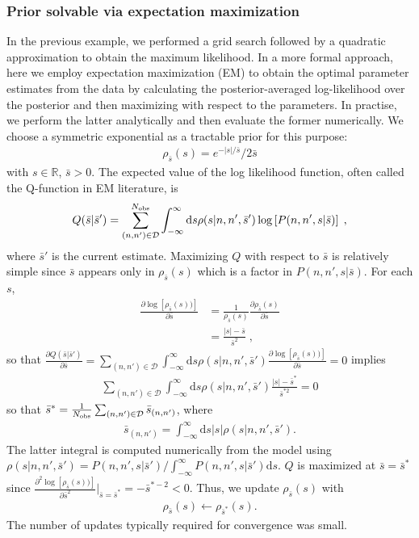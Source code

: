 \documentclass[letterpaper,english,prl,reprint,longbibliography]{revtex4-1} %
\begin{document}
\subsubsection*{Prior solvable via expectation maximization}
In the previous example, we performed a grid search followed by a quadratic approximation to obtain the maximum likelihood. In a more formal approach, here we employ expectation maximization (EM) to obtain the optimal parameter estimates from the data by calculating the posterior-averaged log-likelihood over the posterior and then maximizing with respect to the parameters. In practise, we perform the latter analytically and then evaluate the former numerically. We choose a symmetric exponential as a tractable prior for this purpose:
\begin{align}
	\rho_{\bar{s}}(s)=e^{-|s|/\bar{s}}/2\bar{s}
\end{align}
with $s\in\mathbb{R}$, $\bar{s}>0$. The expected value of the log likelihood function, often called the Q-function in EM literature, is 
 \begin{align}
 Q(\bar{s}|\bar{s}')=\sum_{(n,n')\in\mathcal{D}}^{N_\textrm{\textrm{obs}}}\int_{-\infty}^{\infty}\mathrm{d}s\rho(s|n,n',\bar{s}')\log \left[P(n,n',s|\bar{s})\right]\;,
 \end{align}
 where $\bar{s}'$ is the current estimate.
 Maximizing $Q$  with respect to $\bar{s}$ is relatively simple since $\bar{s}$ appears only in $\rho_{\bar{s}}(s)$  which is a factor in $P(n,n',s|\bar{s})$. For each $s$,
 \begin{align}
 \frac{\partial \log \left[\rho_{\bar{s}}(s))\right] }{\partial\bar{s}} &=\frac{1}{\rho_{\bar{s}}(s)} \frac{\partial\rho_{\bar{s}}(s)}{\partial\bar{s}}\\&=\frac{|s|-\bar{s}}{\bar{s}^2}\;,
 \end{align}
so that $  \frac{\partial Q(\bar{s}|\bar{s}')}{\partial\bar{s}}=\sum_{(n,n')\in\mathcal{D}}\int_{-\infty}^{\infty}\mathrm{d}s\rho(s|n,n',\bar{s}')\frac{\partial \log \left[\rho_{\bar{s}}(s))\right] }{\partial\bar{s}} =0$ implies
\begin{align}
  \sum_{(n,n')\in\mathcal{D}}\int_{-\infty}^{\infty}\mathrm{d}s\rho(s|n,n',\bar{s}')\frac{|s|-\bar{s}^*}{\bar{s}^{*2}} =0
\end{align}
so that $\bar{s}^*=\frac{1}{N_\textrm{\textrm{obs}}}\sum_{(n,n')\in\mathcal{D}}\bar{s}_{(n,n')}$, where 
\begin{align}
\bar{s}_{(n,n')}=\int_{-\infty}^{\infty}\mathrm{d}s|s|\rho(s|n,n',\bar{s}').
\end{align}
The latter integral is computed numerically from the model using $\rho(s|n,n',\bar{s}')=P(n,n',s|\bar{s}')/\int_{-\infty}^{\infty}P(n,n',s|\bar{s}')\mathrm{d}s	$. $Q$ is maximized at $\bar{s}=\bar{s}^*$ since  $ \frac{\partial^2 \log \left[\rho_{\bar{s}}(s))\right] }{\partial\bar{s}^2}\bigg|_{\bar{s}=\bar{s}^*}=-\bar{s}^{*-2} <0$. Thus, we update $\rho_{\bar{s}}(s)$ with 
\begin{align}
\rho_{\bar{s}}(s)\leftarrow\rho_{\bar{s}^*}(s).
\end{align}
The number of updates typically required for convergence was small.
\end{document}
